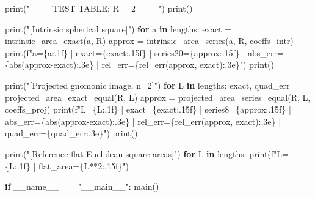 \documentclass[
  12pt,
  a4paper,
]{article}
\newenvironment{Shaded}{}{}
\newcommand{\BuiltInTok}[1]{\textcolor[rgb]{0.00,0.50,0.00}{#1}}
\newcommand{\ControlFlowTok}[1]{\textcolor[rgb]{0.00,0.44,0.13}{\textbf{#1}}}
\newcommand{\DecValTok}[1]{\textcolor[rgb]{0.25,0.63,0.44}{#1}}
\newcommand{\KeywordTok}[1]{\textcolor[rgb]{0.00,0.44,0.13}{\textbf{#1}}}
\newcommand{\NormalTok}[1]{#1}
\newcommand{\OperatorTok}[1]{\textcolor[rgb]{0.40,0.40,0.40}{#1}}
\newcommand{\SpecialCharTok}[1]{\textcolor[rgb]{0.25,0.44,0.63}{#1}}
\newcommand{\SpecialStringTok}[1]{\textcolor[rgb]{0.73,0.40,0.53}{#1}}
\newcommand{\StringTok}[1]{\textcolor[rgb]{0.25,0.44,0.63}{#1}}
\newcommand{\VariableTok}[1]{\textcolor[rgb]{0.10,0.09,0.49}{#1}}
\begin{document}
\begin{Shaded}
\begin{Highlighting}[]
    \BuiltInTok{print}\NormalTok{(}\StringTok{"=== TEST TABLE: R = 2 ==="}\NormalTok{)}
    \BuiltInTok{print}\NormalTok{()}

    \BuiltInTok{print}\NormalTok{(}\StringTok{"[Intrinsic spherical square]"}\NormalTok{)}
    \ControlFlowTok{for}\NormalTok{ a }\KeywordTok{in}\NormalTok{ lengths:}
\NormalTok{        exact }\OperatorTok{=}\NormalTok{ intrinsic\_area\_exact(a, R)}
\NormalTok{        approx }\OperatorTok{=}\NormalTok{ intrinsic\_area\_series(a, R, coeffs\_intr)}
        \BuiltInTok{print}\NormalTok{(}\SpecialStringTok{f"a=}\SpecialCharTok{\{}\NormalTok{a}\SpecialCharTok{:.1f\}}\SpecialStringTok{ | exact=}\SpecialCharTok{\{}\NormalTok{exact}\SpecialCharTok{:.15f\}}\SpecialStringTok{ | series20=}\SpecialCharTok{\{}\NormalTok{approx}\SpecialCharTok{:.15f\}}\SpecialStringTok{ | abs\_err=}\SpecialCharTok{\{}\BuiltInTok{abs}\NormalTok{(approx}\OperatorTok{{-}}\NormalTok{exact)}\SpecialCharTok{:.3e\}}\SpecialStringTok{ | rel\_err=}\SpecialCharTok{\{}\NormalTok{rel\_err(approx, exact)}\SpecialCharTok{:.3e\}}\SpecialStringTok{"}\NormalTok{)}
    \BuiltInTok{print}\NormalTok{()}

    \BuiltInTok{print}\NormalTok{(}\StringTok{"[Projected gnomonic image, n=2]"}\NormalTok{)}
    \ControlFlowTok{for}\NormalTok{ L }\KeywordTok{in}\NormalTok{ lengths:}
\NormalTok{        exact, quad\_err }\OperatorTok{=}\NormalTok{ projected\_area\_exact\_equal(R, L)}
\NormalTok{        approx }\OperatorTok{=}\NormalTok{ projected\_area\_series\_equal(R, L, coeffs\_proj)}
        \BuiltInTok{print}\NormalTok{(}\SpecialStringTok{f"L=}\SpecialCharTok{\{}\NormalTok{L}\SpecialCharTok{:.1f\}}\SpecialStringTok{ | exact=}\SpecialCharTok{\{}\NormalTok{exact}\SpecialCharTok{:.15f\}}\SpecialStringTok{ | series8=}\SpecialCharTok{\{}\NormalTok{approx}\SpecialCharTok{:.15f\}}\SpecialStringTok{ | abs\_err=}\SpecialCharTok{\{}\BuiltInTok{abs}\NormalTok{(approx}\OperatorTok{{-}}\NormalTok{exact)}\SpecialCharTok{:.3e\}}\SpecialStringTok{ | rel\_err=}\SpecialCharTok{\{}\NormalTok{rel\_err(approx, exact)}\SpecialCharTok{:.3e\}}\SpecialStringTok{ | quad\_err=}\SpecialCharTok{\{}\NormalTok{quad\_err}\SpecialCharTok{:.3e\}}\SpecialStringTok{"}\NormalTok{)}
    \BuiltInTok{print}\NormalTok{()}

    \BuiltInTok{print}\NormalTok{(}\StringTok{"[Reference flat Euclidean square areas]"}\NormalTok{)}
    \ControlFlowTok{for}\NormalTok{ L }\KeywordTok{in}\NormalTok{ lengths:}
        \BuiltInTok{print}\NormalTok{(}\SpecialStringTok{f"L=}\SpecialCharTok{\{}\NormalTok{L}\SpecialCharTok{:.1f\}}\SpecialStringTok{ | flat\_area=}\SpecialCharTok{\{}\NormalTok{L}\OperatorTok{**}\DecValTok{2}\SpecialCharTok{:.15f\}}\SpecialStringTok{"}\NormalTok{)}


\ControlFlowTok{if} \VariableTok{\_\_name\_\_} \OperatorTok{==} \StringTok{"\_\_main\_\_"}\NormalTok{:}
\NormalTok{    main()}
\end{Highlighting}
\end{Shaded}
\end{document}
